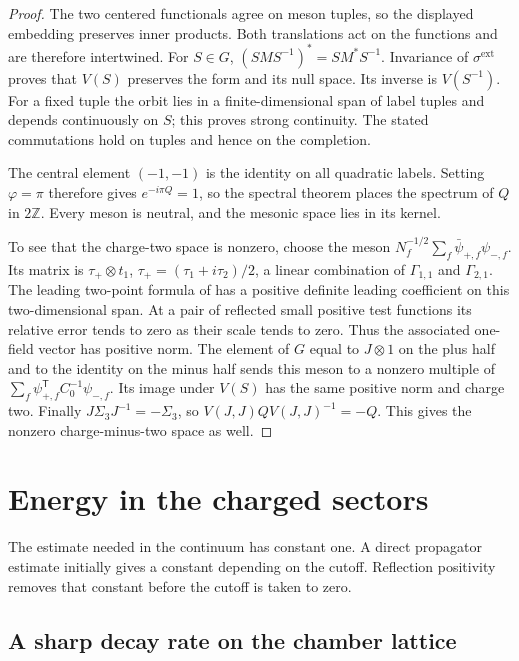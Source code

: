 \documentclass[11pt,letterpaper,reqno]{amsart}
\theoremstyle{definition}
\theoremstyle{remark}
\begin{document}
\begin{proof}
The two centered functionals agree on meson tuples,
so the displayed embedding preserves inner products.
Both translations act on the functions and are
therefore intertwined. For $S\in G$,
$(SMS^{-1})^*=SM^*S^{-1}$. Invariance of
$\sigma^{\mathrm{ext}}$ proves that $V(S)$ preserves
the form and its null space. Its inverse is $V(S^{-1})$.
For a fixed tuple the orbit lies in a finite-dimensional
span of label tuples and depends continuously on $S$;
this proves strong continuity. The stated commutations
hold on tuples and hence on the completion.

The central element $(-1,-1)$ is the identity on all
quadratic labels. Setting $\varphi=\pi$ therefore
gives $e^{-i\pi Q}=1$, so the spectral theorem places
the spectrum of $Q$ in $2\mathbb Z$. Every meson
is neutral, and the mesonic space lies in its kernel.

To see that the charge-two space is nonzero, choose
the meson $N_f^{-1/2}\sum_f\bar\psi_{+,f}\psi_{-,f}$.
Its matrix is $\tau_+\otimes t_1$,
$\tau_+=(\tau_1+i\tau_2)/2$, a linear combination of
$\Gamma_{1,1}$ and $\Gamma_{2,1}$.
The leading two-point formula of
\cite[Prop. 11.1]{QCDM1}
has a positive definite leading coefficient on this
two-dimensional span. At a pair of reflected small
positive test functions its relative error tends to
zero as their scale tends to zero. Thus the associated
one-field vector has positive norm. The element of
$G$ equal to $J\otimes1$ on the plus half
and to the identity on the minus half sends this
meson to a nonzero multiple of
$\sum_f\psi_{+,f}^{\mathsf T}C_0^{-1}\psi_{-,f}$.
Its image under $V(S)$ has the same positive norm
and charge two. Finally $J\Sigma_3J^{-1}=-\Sigma_3$,
so $V(J,J)QV(J,J)^{-1}=-Q$. This gives the nonzero
charge-minus-two space as well.
\end{proof}

\section{Energy in the charged sectors}
\label{sec:qcd2-charged-energy}

The estimate needed in the continuum has constant one.
A direct propagator estimate initially gives a constant
depending on the cutoff. Reflection positivity removes
that constant before the cutoff is taken to zero.

\subsection{A sharp decay rate on the chamber lattice}
\end{document}
